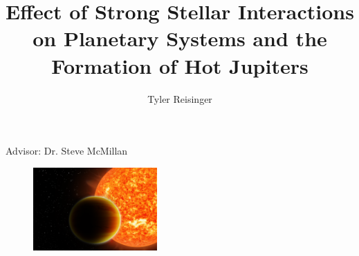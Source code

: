 \documentclass{beamer}
\title{Effect of Strong Stellar Interactions on Planetary Systems and
            the Formation of Hot Jupiters}
\author{Tyler Reisinger}
\date{}
\begin{document}
\begin{frame}
    \maketitle
    \begin{center}
        Advisor: Dr. Steve McMillan
    \end{center}
    \begin{figure}
        \centering
        \includegraphics[height=1.25in]{Image1_HotJupiter1}
    \end{figure}
\end{frame}
\end{document}
